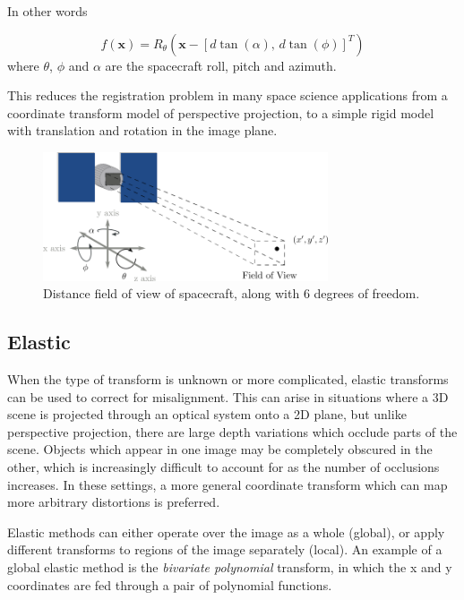 \documentclass[tocnosub,noragright,centerchapter,12pt]{uiucecethesis09}
\begin{document}



In other words

$$f(\bm{x}) = R_{\theta} \left(\bm{x} - [d \tan(\alpha),\, d \tan(\phi)]^T \right)$$
where $\theta$, $\phi$ and $\alpha$ are the spacecraft roll, pitch and azimuth.

This reduces the registration problem in many space science applications from a coordinate transform model of perspective projection, to a simple rigid model with translation and rotation in the image plane.


\begin{figure}
  \centering
  \includegraphics[width=0.75\textwidth]{figures/perspective_approx.png}
  \caption{Distance field of view of spacecraft, along with 6 degrees of freedom.}
\end{figure}

\subsection{Elastic}

When the type of transform is unknown or more complicated, elastic transforms can be used to correct for misalignment.  This can arise in situations where a 3D scene is projected through an optical system onto a 2D plane, but unlike perspective projection, there are large depth variations which occlude parts of the scene.  Objects which appear in one image may be completely obscured in the other, which is increasingly difficult to account for as the number of occlusions increases.  In these settings, a more general coordinate transform which can map more arbitrary distortions is preferred.

Elastic methods can either operate over the image as a whole (global), or apply different transforms to regions of the image separately (local).  An example of a global elastic method is the \emph{bivariate polynomial} transform, in which the x and y coordinates are fed through a pair of polynomial functions.
\end{document}
